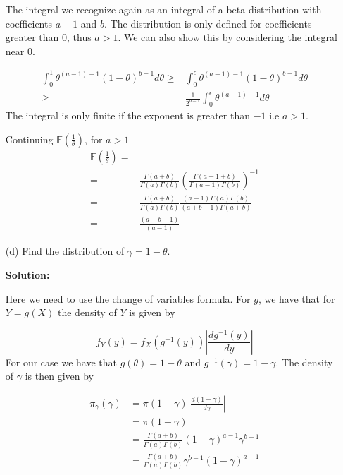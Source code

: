 \documentclass{article}
\begin{document}
\begin{enumerate}
    The integral we recognize again as an integral of a beta distribution with coefficients $a-1$ and $b$. The distribution is only defined for coefficients greater than 0, thus $a > 1$. We can also show this by considering the integral near 0.
    
    \begin{align*}
        \int_0^1 \theta^{(a-1)-1}(1-\theta)^{b-1} d \theta \geq& \int_0^{\epsilon} \theta^{(a-1)-1}(1-\theta)^{b-1} d \theta\\
         \geq&  \frac{1}{2^{b-1}} \int_0^{\epsilon} \theta^{(a-1)-1} d \theta
    \end{align*}
    The integral is only finite if the exponent is greater than $-1$ i.e $a > 1$.
    \par
    Continuing $\mathbb{E}\left(\frac{1}{\theta}\right)$, for $a > 1$
    \begin{align*}
        \mathbb{E}\left(\frac{1}{\theta}\right) =& \\
                    =&  \frac{\Gamma(a + b)}{\Gamma(a) \Gamma(b)} \left(  \frac{\Gamma(a -1 + b)}{\Gamma(a - 1)   \Gamma(b)}\right)^{-1}\\
                    =& \frac{\Gamma(a + b)}{\Gamma(a) \Gamma(b)} \frac{(a-1)\Gamma(a)  \Gamma(b)}{(a+b-1) \Gamma(a+b)}\\
                    =& \frac{(a+b-1)}{(a-1)}
    \end{align*}

    \item[(d)] Find the distribution of $\gamma = 1-\theta$.
    
    \textbf{Solution:}
    \par

    Here we need to use the change of variables formula. For $g$, we have that for $Y = g(X)$ the density of $Y$ is given by
    
    \[
    f_Y(y) = f_X(g^{-1}(y)) \left| \frac{d g^{-1}(y)}{dy} \right|
    \]
    For our case we have that $g(\theta) = 1-\theta$ and $g^{-1}(\gamma) = 1-\gamma$. The density of $\gamma$ is then given by

    \begin{align*}
    \pi_{\gamma}(\gamma) &= \pi(1-\gamma) \left| \frac{d(1-\gamma)}{d\gamma} \right|\\
     &= \pi(1-\gamma) \\
     &= \frac{\Gamma(a+b)}{\Gamma(a)  \Gamma(b)} (1-\gamma)^{a-1} \gamma^{b-1}\\
     &= \frac{\Gamma(a+b)}{\Gamma(a)  \Gamma(b)}  \gamma^{b-1}(1-\gamma)^{a-1}
    \end{align*}


\end{enumerate}
\end{document}
